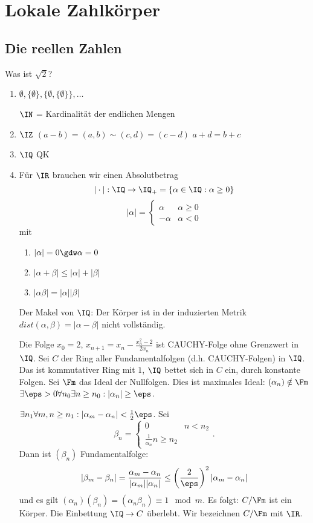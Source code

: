 \renewcommand{\lecdate}{06.01.2015}

\newpage
\section{Lokale Zahlkörper}

\subsection{Die reellen Zahlen}

Was ist $\sqrt 2$?
\begin{enumerate}
 \item $\emptyset, \{\emptyset\}, \{\emptyset, \{\emptyset\}\},\ldots$
 
 $\IN$ = Kardinalität der endlichen Mengen
 \item $\IZ$ $(a-b)=(a,b)\sim (c,d)=(c-d)$ \gdw $a+d=b+c$
 \item $\IQ$ QK
 \item Für $\IR$ brauchen wir einen Absolutbetrag
	\[ |\cdot |:\IQ\rightarrow \IQ_+=\{\alpha\in\IQ: \alpha\geq 0\} \]
	\[ |\alpha|=\begin{cases}
	             \alpha & \alpha\geq 0\\
	             -\alpha & \alpha<0
	            \end{cases}\]
	mit \begin{enumerate}
	     \item $|\alpha|=0 \gdw \alpha=0$
	     \item $|\alpha+\beta|\leq |\alpha|+|\beta|$
	     \item $|\alpha\beta|=|\alpha||\beta|$
	    \end{enumerate}
   Der Makel von $\IQ$: Der Körper ist in der induzierten Metrik $dist(\alpha,\beta)=|\alpha-\beta|$ nicht vollständig.

    Die Folge $x_0=2$, $x_{n+1}=x_n-\frac{x_n^2-2}{2x_n}$ ist CAUCHY-Folge ohne Grenzwert in $\IQ$.
    Sei $C$ der Ring aller Fundamentalfolgen (d.h. CAUCHY-Folgen) in $\IQ$. Das ist kommutativer Ring mit $1$, $\IQ$ bettet sich in $C$ ein, durch konstante Folgen. Sei $\Fm$ das Ideal der Nullfolgen. Dies ist maximales Ideal: $(\alpha_n)\notin\Fm$ \folge $\exists\eps>0\forall n_0\exists n\geq n_0: |\alpha_n|\geq \eps$.
    
    $\exists n_1\forall m,n\geq n_1: |\alpha_m-\alpha_n|<\frac{1}{2}\eps$. Sei \[\beta_n=\begin{cases}
                                                                                         0 & n<n_2\\
                                                                                         \frac{1}{\alpha_n} n\geq n_2
                                                                                        \end{cases}.\]
    Dann ist $(\beta_n)$ Fundamentalfolge: \[ |\beta_m-\beta_n|=\frac{\alpha_m-\alpha_n}{|\alpha_m||\alpha_n|}\leq\left(\frac{2}{\eps}\right)^2|\alpha_m-\alpha_n|\]
    und es gilt $(\alpha_n)(\beta_n)=(\alpha_n\beta_n)\equiv 1\mod{m}$. Es folgt: $C/\Fm$ ist ein Körper. Die Einbettung $\IQ\rightarrow C$ überlebt. Wir bezeichnen $C/\Fm$ mit $\IR$.
    

\end{enumerate}

